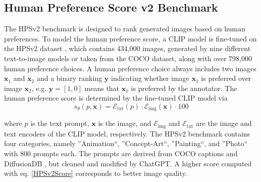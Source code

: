 \subsection{Human Preference Score v2 Benchmark}
The \gls{HPSv2} benchmark \cite{HPSv2} is designed to rank generated images based on human preferences. To model the human preference score, a \gls{CLIP} model \cite{CLIP} is fine-tuned on the HPSv2 dataset \cite{HPSv2}, which contains 434,000 images, generated by nine different text-to-image models or taken from the COCO dataset, along with over 798,000 human preference choices. A human preference choice always includes two images $\mathbf{x}_1$ and $\mathbf{x}_2$ and a binary ranking $\mathbf{y}$ indicating whether image $\mathbf{x}_1$ is preferred over image $\mathbf{x}_2$, e.g. $\mathbf{y}=[1,0]$ means that $\mathbf{x}_1$ is preferred by the annotator. The human preference score is determined by the fine-tuned \gls{CLIP} model via 
\begin{equation}
	s_\theta (p,\mathbf{x}) = \mathcal{E}_\text{txt}(p) \cdot \mathcal{E}_\text{img}(\mathbf{x}) \cdot 100
	\label{HPSv2Score}
\end{equation}

where $p$ is the text prompt, $\mathbf{x}$ is the image, and $\mathcal{E}_\text{img}$ and  $\mathcal{E}_\text{txt}$ are the image and text encoders of the \gls{CLIP} model, respectively. The \gls{HPSv2} benchmark contains four categories, namely ''Animation``, ''Concept-Art``, ''Painting``, and ''Photo`` with 800 prompts each. The prompts are derived from COCO captions \cite{COCO} and DiffusionDB \cite{DiffusionDB}, but cleaned and modified by ChatGPT. A higher score computed with eq. \ref{HPSv2Score} corresponds to better image quality.

